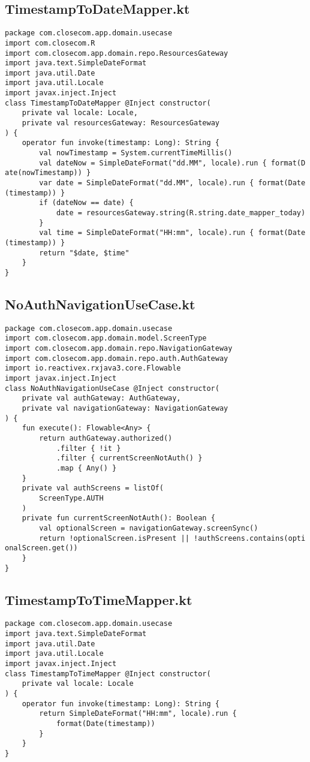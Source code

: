 \documentclass[listing]{espd}
\begin{document}
\subsection{TimestampToDateMapper.kt}
\begin{verbatim}
package com.closecom.app.domain.usecase
import com.closecom.R
import com.closecom.app.domain.repo.ResourcesGateway
import java.text.SimpleDateFormat
import java.util.Date
import java.util.Locale
import javax.inject.Inject
class TimestampToDateMapper @Inject constructor(
    private val locale: Locale,
    private val resourcesGateway: ResourcesGateway
) {
    operator fun invoke(timestamp: Long): String {
        val nowTimestamp = System.currentTimeMillis()
        val dateNow = SimpleDateFormat("dd.MM", locale).run { format(D
ate(nowTimestamp)) }
        var date = SimpleDateFormat("dd.MM", locale).run { format(Date
(timestamp)) }
        if (dateNow == date) {
            date = resourcesGateway.string(R.string.date_mapper_today)
        }
        val time = SimpleDateFormat("HH:mm", locale).run { format(Date
(timestamp)) }
        return "$date, $time"
    }
}
\end{verbatim}

\subsection{NoAuthNavigationUseCase.kt}
\begin{verbatim}
package com.closecom.app.domain.usecase
import com.closecom.app.domain.model.ScreenType
import com.closecom.app.domain.repo.NavigationGateway
import com.closecom.app.domain.repo.auth.AuthGateway
import io.reactivex.rxjava3.core.Flowable
import javax.inject.Inject
class NoAuthNavigationUseCase @Inject constructor(
    private val authGateway: AuthGateway,
    private val navigationGateway: NavigationGateway
) {
    fun execute(): Flowable<Any> {
        return authGateway.authorized()
            .filter { !it }
            .filter { currentScreenNotAuth() }
            .map { Any() }
    }
    private val authScreens = listOf(
        ScreenType.AUTH
    )
    private fun currentScreenNotAuth(): Boolean {
        val optionalScreen = navigationGateway.screenSync()
        return !optionalScreen.isPresent || !authScreens.contains(opti
onalScreen.get())
    }
}
\end{verbatim}

\subsection{TimestampToTimeMapper.kt}
\begin{verbatim}
package com.closecom.app.domain.usecase
import java.text.SimpleDateFormat
import java.util.Date
import java.util.Locale
import javax.inject.Inject
class TimestampToTimeMapper @Inject constructor(
    private val locale: Locale
) {
    operator fun invoke(timestamp: Long): String {
        return SimpleDateFormat("HH:mm", locale).run {
            format(Date(timestamp))
        }
    }
}
\end{verbatim}
\end{document}
